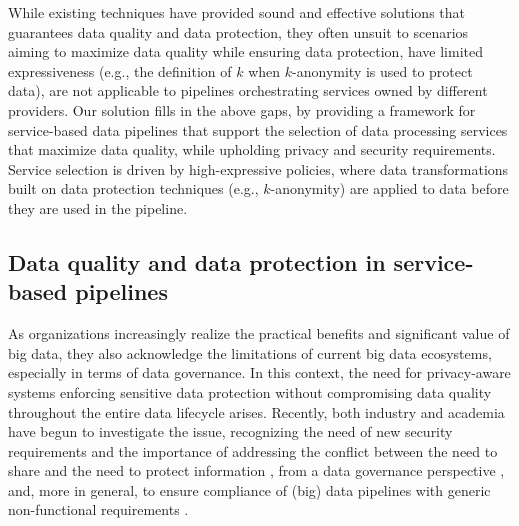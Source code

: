 {\color{OurColor} While existing techniques have provided sound and effective solutions that guarantees data quality and data protection, they often unsuit to scenarios aiming to maximize data quality while ensuring data protection, have limited expressiveness (e.g., the definition of $k$ when $k$-anonymity is used to protect data), are not applicable to pipelines orchestrating services owned by different providers. Our solution fills in the above gaps, by providing a framework for service-based data pipelines that support the selection of data processing services that maximize data quality, while upholding privacy and security requirements. Service selection is driven by high-expressive policies, where data transformations built on data protection techniques (e.g., $k$-anonymity) are applied to data before they are used in the pipeline.}

\subsection{Data quality and data protection in service-based pipelines}\label{sec:datagov}

As organizations increasingly realize the practical benefits and significant value of big data, they also acknowledge the limitations of current big data ecosystems, especially in terms of data governance. In this context, the need for privacy-aware systems enforcing sensitive data protection without compromising data quality throughout the entire data lifecycle arises. Recently, both industry and academia have begun to investigate the issue, recognizing the need of new security requirements \cite{Colombo:JournCybersec:2019} and the importance of addressing the conflict between the need to share and the need to protect information \cite{balancingact,VANDENBROEK2018330,balancingInMedicine,needtobalance,dataProtection}, from a data governance perspective \cite{al2018exploring,aissa2020decide}, and, more in general, to ensure compliance of (big) data pipelines with generic non-functional requirements \cite{ABBJ.ICWS2022,ABHKKS.BD2023}.

